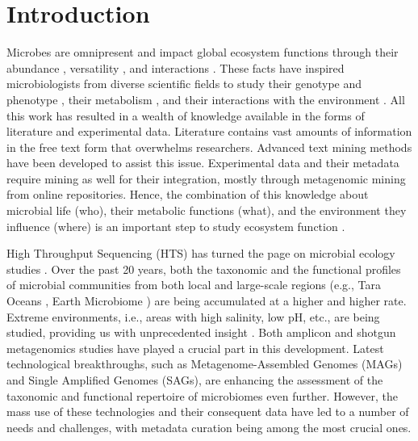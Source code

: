\section{Introduction}
\label{sec:prego-intro}

   Microbes are omnipresent and impact global ecosystem functions \cite{falkowski2008microbial} through their abundance \cite{bar2018biomass}, versatility \cite{delgado2016microbial}, and interactions \cite{rottjers2018hairballs}. 
   These facts have inspired microbiologists from diverse scientific fields to study their genotype and phenotype \cite{morris2020linking}, their metabolism \cite{biggs2015metabolic}, and their interactions with the environment \cite{hall2018understanding}. 
   All this work has resulted in a wealth of knowledge available in the forms of literature and experimental data. Literature contains vast amounts of information in the free text form that overwhelms researchers. 
   Advanced text mining methods \cite{jensen2006literature} have been developed to assist this issue. 
   Experimental data and their metadata require mining \cite{delmont2011metagenomic} as well for their integration, mostly through metagenomic mining from online repositories. 
   Hence, the combination of this knowledge about microbial life (who), their metabolic functions (what), and the environment they influence (where) is an important step to study ecosystem function \cite{raes2008molecular}.

   High Throughput Sequencing (HTS) has turned the page on microbial ecology studies \cite{nilsson2019mycobiome}. 
   Over the past 20 years, both the taxonomic and the functional profiles of microbial communities from both local and large-scale regions (e.g., Tara Oceans \cite{pesant2015open}, Earth Microbiome \cite{gilbert2014earth}) are being accumulated at a higher and higher rate. 
   Extreme environments, i.e., areas with high salinity, low pH, etc., are being studied, providing us with unprecedented insight \cite{shu2021microbial}. 
   Both amplicon and shotgun metagenomics studies have played a crucial part in this development. Latest technological breakthroughs, such as Metagenome-Assembled Genomes (MAGs) and Single Amplified Genomes (SAGs), are enhancing the assessment of the taxonomic and functional repertoire of microbiomes even further. 
   However, the mass use of these technologies and their consequent data have led to a number of needs and challenges, with metadata curation being among the most crucial ones.


